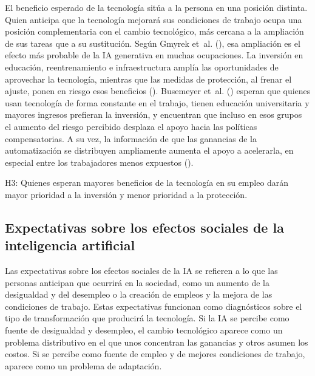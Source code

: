 \documentclass[
  spanish,
  12pt,
]{article}
\begin{document}
El beneficio esperado de la tecnología sitúa a la persona en una
posición distinta. Quien anticipa que la tecnología mejorará sus
condiciones de trabajo ocupa una posición complementaria con el cambio
tecnológico, más cercana a la ampliación de sus tareas que a su
sustitución. Según Gmyrek et~al.
(), esa ampliación es el
efecto más probable de la IA generativa en muchas ocupaciones. La
inversión en educación, reentrenamiento e infraestructura amplía las
oportunidades de aprovechar la tecnología, mientras que las medidas de
protección, al frenar el ajuste, ponen en riesgo esos beneficios
(). Busemeyer
et~al. () esperan que
quienes usan tecnología de forma constante en el trabajo, tienen
educación universitaria y mayores ingresos prefieran la inversión, y
encuentran que incluso en esos grupos el aumento del riesgo percibido
desplaza el apoyo hacia las políticas compensatorias. A su vez, la
información de que las ganancias de la automatización se distribuyen
ampliamente aumenta el apoyo a acelerarla, en especial entre los
trabajadores menos expuestos ().

\begin{tcolorbox}[enhanced jigsaw, arc=.35mm, bottomrule=.15mm, breakable, colback=white, colframe=quarto-callout-note-color-frame, left=2mm, leftrule=.75mm, opacityback=0, rightrule=.15mm, toprule=.15mm]

H3: Quienes esperan mayores beneficios de la tecnología en su empleo
darán mayor prioridad a la inversión y menor prioridad a la protección.

\end{tcolorbox}

\subsection{Expectativas sobre los efectos sociales de la inteligencia
artificial}\label{expectativas-sobre-los-efectos-sociales-de-la-inteligencia-artificial}

Las expectativas sobre los efectos sociales de la IA se refieren a lo
que las personas anticipan que ocurrirá en la sociedad, como un aumento
de la desigualdad y del desempleo o la creación de empleos y la mejora
de las condiciones de trabajo. Estas expectativas funcionan como
diagnósticos sobre el tipo de transformación que producirá la
tecnología. Si la IA se percibe como fuente de desigualdad y desempleo,
el cambio tecnológico aparece como un problema distributivo en el que
unos concentran las ganancias y otros asumen los costos. Si se percibe
como fuente de empleo y de mejores condiciones de trabajo, aparece como
un problema de adaptación.
\end{document}
